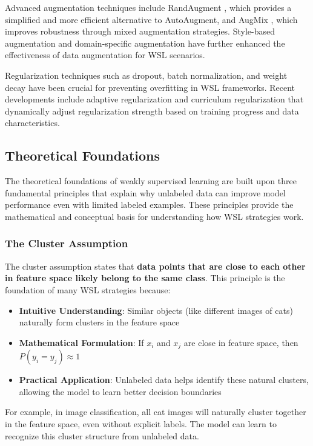 \documentclass{ieeeaccess}
\begin{document}
Advanced augmentation techniques include RandAugment \cite{b25}, which provides a simplified and more efficient alternative to AutoAugment, and AugMix \cite{b26}, which improves robustness through mixed augmentation strategies. Style-based augmentation \cite{b27} and domain-specific augmentation \cite{b28} have further enhanced the effectiveness of data augmentation for WSL scenarios.

Regularization techniques such as dropout, batch normalization, and weight decay have been crucial for preventing overfitting in WSL frameworks. Recent developments include adaptive regularization \cite{b27} and curriculum regularization \cite{b21} that dynamically adjust regularization strength based on training progress and data characteristics.

\subsection{Theoretical Foundations}
The theoretical foundations of weakly supervised learning are built upon three fundamental principles that explain why unlabeled data can improve model performance even with limited labeled examples. These principles provide the mathematical and conceptual basis for understanding how WSL strategies work.

\subsubsection{The Cluster Assumption}
The cluster assumption states that \textbf{data points that are close to each other in feature space likely belong to the same class}. This principle is the foundation of many WSL strategies because:

\begin{itemize}
\item \textbf{Intuitive Understanding}: Similar objects (like different images of cats) naturally form clusters in the feature space
\item \textbf{Mathematical Formulation}: If $x_i$ and $x_j$ are close in feature space, then $P(y_i = y_j) \approx 1$
\item \textbf{Practical Application}: Unlabeled data helps identify these natural clusters, allowing the model to learn better decision boundaries
\end{itemize}

For example, in image classification, all cat images will naturally cluster together in the feature space, even without explicit labels. The model can learn to recognize this cluster structure from unlabeled data.
\end{document}

